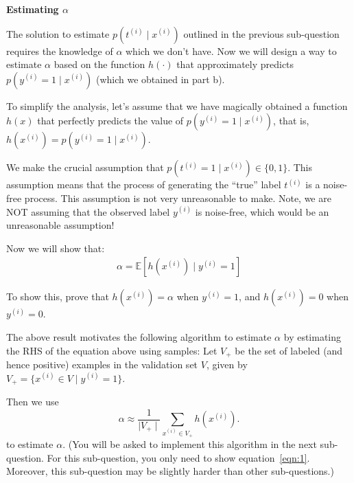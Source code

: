\item {} \textbf{Estimating $\alpha$}

The solution to estimate $p(t^{(i)} \mid x^{(i)})$ outlined in the previous sub-question requires the knowledge of $\alpha$ which we don't have. Now we will design a way to estimate $\alpha$ based on the function $h(\cdot)$ that approximately predicts $p(y^{(i)}=1\mid x^{(i)})$ (which we obtained in part b).  

To simplify the analysis, let's assume that we have magically obtained a function $h(x)$ that perfectly predicts the value of $p(y^{(i)}=1\mid x^{(i)})$, that is, $h(x^{(i)} )= p(y^{(i)} = 1\mid x^{(i)})$.

We make the crucial assumption that $p(t^{(i)}=1\mid x^{(i)}) \in \{0,1\}$. This assumption means that the process of generating the ``true'' label $t^{(i)}$ is a noise-free process. This assumption is not very unreasonable to make. Note, we are NOT assuming that the observed label $y^{(i)}$ is noise-free, which would be an unreasonable assumption!

Now we will show that:
\begin{align}
\alpha = \mathbb{E}[h(x^{(i)})\mid y^{(i)}=1] \label{eqn:1}
\end{align}

To show this, prove that $h(x^{(i)}) = \alpha$ when $y^{(i)} = 1$, and $h(x^{(i)}) = 0$ when $y^{(i)} = 0$.

The above result motivates the following algorithm to estimate $\alpha$ by estimating the RHS of the equation above using samples: 
Let $V_{+}$ be the set of labeled (and hence positive) examples in the validation set $V$, given by $V_{+} = \{x^{(i)}\in V\mid y^{(i)} = 1\}$.

Then we use 
\begin{equation*}
\alpha \approx \frac{1}{\mid V_{+} \mid}\sum_{x^{(i)}\in V_{+}} h(x^{(i)}).
\end{equation*}
to estimate $\alpha$. (You will be asked to implement this algorithm in the next sub-question. For this sub-question, you only need to show equation~\eqref{eqn:1}. Moreover, this sub-question may be slightly harder than other sub-questions.)

